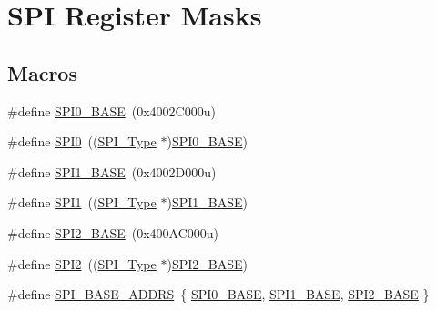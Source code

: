 \hypertarget{group___s_p_i___register___masks}{}\section{S\+PI Register Masks}
\label{group___s_p_i___register___masks}
\subsection*{Macros}
\begin{DoxyCompactItemize}
\item 
\#define \mbox{\hyperlink{group___s_p_i___register___masks_gadeaa49ab944c7dcae2a868b0450232c8}{S\+P\+I0\+\_\+\+B\+A\+SE}}~(0x4002\+C000u)
\item 
\#define \mbox{\hyperlink{group___s_p_i___register___masks_gaf26e39c91b262cc480085abcc450d3d5}{S\+P\+I0}}~((\mbox{\hyperlink{struct_s_p_i___type}{S\+P\+I\+\_\+\+Type}} $\ast$)\mbox{\hyperlink{group___s_p_i___register___masks_gadeaa49ab944c7dcae2a868b0450232c8}{S\+P\+I0\+\_\+\+B\+A\+SE}})
\item 
\#define \mbox{\hyperlink{group___s_p_i___register___masks_ga50cd8b47929f18b05efbd0f41253bf8d}{S\+P\+I1\+\_\+\+B\+A\+SE}}~(0x4002\+D000u)
\item 
\#define \mbox{\hyperlink{group___s_p_i___register___masks_gad483be344a28ac800be8f03654a9612f}{S\+P\+I1}}~((\mbox{\hyperlink{struct_s_p_i___type}{S\+P\+I\+\_\+\+Type}} $\ast$)\mbox{\hyperlink{group___s_p_i___register___masks_ga50cd8b47929f18b05efbd0f41253bf8d}{S\+P\+I1\+\_\+\+B\+A\+SE}})
\item 
\#define \mbox{\hyperlink{group___s_p_i___register___masks_gac3e357b4c25106ed375fb1affab6bb86}{S\+P\+I2\+\_\+\+B\+A\+SE}}~(0x400\+A\+C000u)
\item 
\#define \mbox{\hyperlink{group___s_p_i___register___masks_gaf2c3d8ce359dcfbb2261e07ed42af72b}{S\+P\+I2}}~((\mbox{\hyperlink{struct_s_p_i___type}{S\+P\+I\+\_\+\+Type}} $\ast$)\mbox{\hyperlink{group___s_p_i___register___masks_gac3e357b4c25106ed375fb1affab6bb86}{S\+P\+I2\+\_\+\+B\+A\+SE}})
\item 
\#define \mbox{\hyperlink{group___s_p_i___register___masks_gab542f6d657e05e21cc2c9e66ae3ceb41}{S\+P\+I\+\_\+\+B\+A\+S\+E\+\_\+\+A\+D\+D\+RS}}~\{ \mbox{\hyperlink{group___s_p_i___register___masks_gadeaa49ab944c7dcae2a868b0450232c8}{S\+P\+I0\+\_\+\+B\+A\+SE}}, \mbox{\hyperlink{group___s_p_i___register___masks_ga50cd8b47929f18b05efbd0f41253bf8d}{S\+P\+I1\+\_\+\+B\+A\+SE}}, \mbox{\hyperlink{group___s_p_i___register___masks_gac3e357b4c25106ed375fb1affab6bb86}{S\+P\+I2\+\_\+\+B\+A\+SE}} \}

\end{DoxyCompactItemize}
